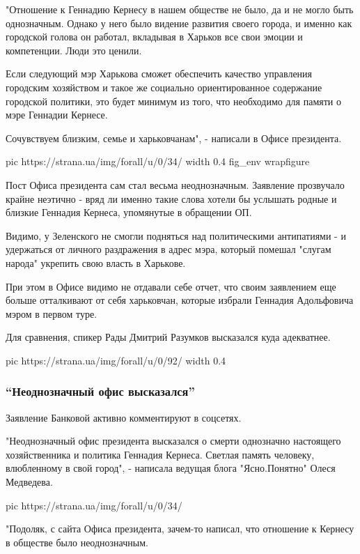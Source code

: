 "Отношение к Геннадию Кернесу в нашем обществе не было, да и не могло быть
однозначным. Однако у него было видение развития своего города, и именно как
городской голова он работал, вкладывая в Харьков все свои эмоции и компетенции.
Люди это ценили.

Если следующий мэр Харькова сможет обеспечить качество управления городским
хозяйством и такое же социально ориентированное содержание городской политики,
это будет минимум из того, что необходимо для памяти о мэре Геннадии Кернесе.

Сочувствуем близким, семье и харьковчанам", - написали в Офисе президента.

\ifcmt
  pic https://strana.ua/img/forall/u/0/34/%
  width 0.4
  fig_env wrapfigure
\fi

Пост Офиса президента сам стал весьма неоднозначным. Заявление прозвучало
крайне неэтично - вряд ли именно такие слова хотели бы услышать родные и
близкие Геннадия Кернеса, упомянутые в обращении ОП. 

Видимо, у Зеленского не смогли подняться над политическими антипатиями - и
удержаться от личного раздражения в адрес мэра, который помешал "слугам народа"
укрепить свою власть в Харькове. 

При этом в Офисе видимо не отдавали себе отчет, что своим заявлением еще больше
отталкивают от себя харьковчан, которые избрали Геннадия Адольфовича мэром в
первом туре. 

Для сравнения, спикер Рады Дмитрий Разумков высказался куда адекватнее.

\ifcmt
  pic https://strana.ua/img/forall/u/0/92/%
  width 0.4
\fi

\subsubsection{\enquote{Неоднозначный офис высказался}}

Заявление Банковой активно комментируют в соцсетях.

"Неоднозначный офис президента высказался о смерти однозначно настоящего
хозяйственника и политика Геннадия Кернеса. Светлая память человеку,
влюбленному в свой город", - написала ведущая блога "Ясно.Понятно" Олеся
Медведева.

\ifcmt
pic https://strana.ua/img/forall/u/0/34/%
\fi

"Подоляк, с сайта Офиса президента, зачем-то написал, что отношение к Кернесу в
обществе было неоднозначным.

